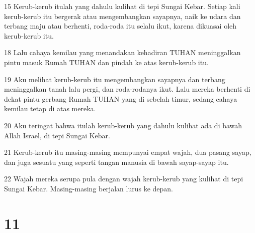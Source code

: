 \par 15 Kerub-kerub itulah yang dahulu kulihat di tepi Sungai Kebar. Setiap kali kerub-kerub itu bergerak atau mengembangkan sayapnya, naik ke udara dan terbang maju atau berhenti, roda-roda itu selalu ikut, karena dikuasai oleh kerub-kerub itu.
\par 18 Lalu cahaya kemilau yang menandakan kehadiran TUHAN meninggalkan pintu masuk Rumah TUHAN dan pindah ke atas kerub-kerub itu.
\par 19 Aku melihat kerub-kerub itu mengembangkan sayapnya dan terbang meninggalkan tanah lalu pergi, dan roda-rodanya ikut. Lalu mereka berhenti di dekat pintu gerbang Rumah TUHAN yang di sebelah timur, sedang cahaya kemilau tetap di atas mereka.
\par 20 Aku teringat bahwa itulah kerub-kerub yang dahulu kulihat ada di bawah Allah Israel, di tepi Sungai Kebar.
\par 21 Kerub-kerub itu masing-masing mempunyai empat wajah, dua pasang sayap, dan juga sesuatu yang seperti tangan manusia di bawah sayap-sayap itu.
\par 22 Wajah mereka serupa pula dengan wajah kerub-kerub yang kulihat di tepi Sungai Kebar. Masing-masing berjalan lurus ke depan.

\chapter{11}

